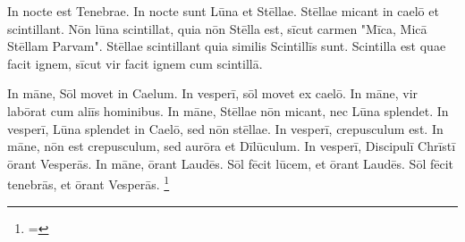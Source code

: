 In nocte est Tenebrae. In nocte sunt Lūna et Stēllae. Stēllae micant in caelō et scintillant. Nōn lūna scintillat, quia nōn Stēlla est, sīcut carmen "Mīca, Micā Stēllam Parvam". Stēllae scintillant quia similis Scintillīs sunt. Scintilla est quae facit ignem, sīcut vir facit ignem cum scintillā. 

In māne, Sōl movet in Caelum. In vesperī, sōl movet ex caelō. In māne, vir labōrat cum aliīs hominibus. In māne, Stēllae nōn micant, nec Lūna splendet. In vesperī, Lūna splendet in Caelō, sed nōn stēllae. In vesperī, crepusculum est. In māne, nōn est crepusculum, sed aurōra et Dīlūculum. In vesperī, Discipulī Chrīstī ōrant Vesperās. In māne, ōrant Laudēs. Sōl fēcit lūcem, et ōrant Laudēs. Sōl fēcit tenebrās, et ōrant Vesperās. 
\footnote{\textbf{} = }